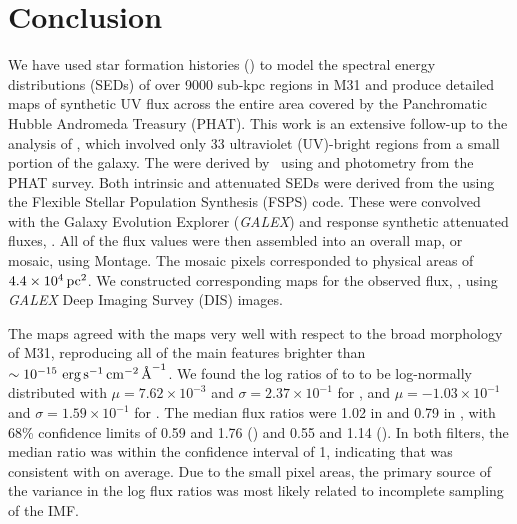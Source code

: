 \documentclass[iop, tighten]{emulateapj}
\begin{document}





\section{Conclusion}\label{conclusion}

We have used star formation histories () to model the spectral energy
distributions (SEDs) of over 9000 sub-kpc regions in M31 and produce detailed
maps of synthetic UV flux across the entire area covered by the Panchromatic
Hubble Andromeda Treasury (PHAT). This work is an extensive follow-up to the
analysis of \citet{Simones:2014}, which involved only 33 ultraviolet (UV)-bright
regions from a small portion of the galaxy. The  were derived by
\citet{Lewis:2015}\ using \acsb{} and \acsi{} photometry from the PHAT survey.
Both intrinsic and attenuated SEDs were derived from the  using the
Flexible Stellar Population Synthesis (FSPS) code. These were convolved with the
Galaxy Evolution Explorer (\emph{GALEX}) \fuv{} and \nuv{} response synthetic
attenuated fluxes, \fxsfh{}. All of the flux values were then assembled into an
overall map, or mosaic, using Montage. The mosaic pixels corresponded to
physical areas of $4.4\times 10^4\,\mathrm{pc}^2$. We constructed corresponding maps for
the observed flux, \fxobs{}, using \emph{GALEX} Deep Imaging Survey (DIS)
images.

The \fxsfh{} maps agreed with the \fxobs{} maps very well with respect to the
broad morphology of M31, reproducing all of the main features brighter than
$\sim 10^{-15}\, \,\mathrm{erg}\,\mathrm{s}^{-1}\,\mathrm{cm}^{-2}\,\textrm{\AA}^{-1}$. We found the log ratios of \fxsfh{} to \fxobs{} to be
log-normally distributed with $\mu = 7.62\times 10^{-3}$ and $\sigma =
2.37\times 10^{-1}$ for \fuv{}, and $\mu = -1.03\times 10^{-1}$ and $\sigma =
1.59\times 10^{-1}$ for \nuv{}. The median flux ratios were 1.02 in \fuv{} and
0.79 in \nuv{}, with 68\% confidence limits of 0.59 and 1.76 (\fuv{}) and 0.55
and 1.14 (\nuv{}). In both filters, the median ratio was within the confidence
interval of 1, indicating that \fxsfh{} was consistent with \fxobs{} on average.
Due to the small pixel areas, the primary source of the variance in the log flux
ratios was most likely related to incomplete sampling of the IMF.
\end{document}
